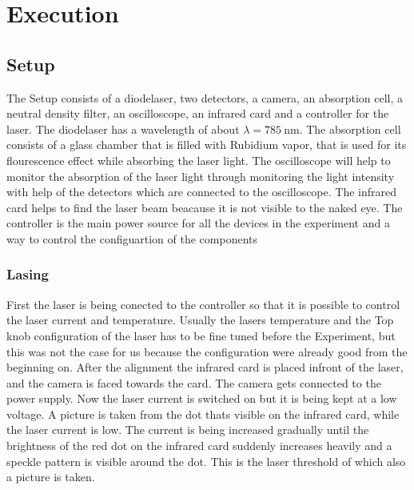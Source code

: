 \section{Execution}
\label{sec:Durchführung}

\subsection{Setup}
The Setup consists of a diodelaser, two detectors, a camera, an absorption cell, a neutral density filter, an oscilloscope, an infrared card and a controller for the laser.
The diodelaser has a wavelength of about $\lambda = \SI{785}{\nano\meter}$.
The absorption cell consists of a glass chamber that is filled with Rubidium vapor, that is used for its flourescence effect while absorbing the laser light.
The oscilloscope will help to monitor the absorption of the laser light through monitoring the light intensity with help of the detectors which are connected to the oscilloscope.
The infrared card helps to find the laser beam beacause it is not visible to the naked eye.
The controller is the main power source for all the devices in the experiment and a way to control the configuartion of the components

\subsubsection{Lasing}
First the laser is being conected to the controller so that it is possible to control the laser current and temperature.
Usually the lasers temperature and the Top knob configuration of the laser has to be fine tuned before the Experiment, but this was not the case for us because the configuration were already good from the beginning on.
After the alignment the infrared card is placed infront of the laser, and the camera is faced towards the card.
The camera gets connected to the power supply.
Now the laser current is switched on but it is being kept at a low voltage.
A picture is taken from the dot thats visible on the infrared card, while the laser current is low.
The current is being increased gradually until the brightness of the red dot on the infrared card suddenly increases heavily and a speckle pattern is visible around the dot.
This is the laser threshold of which also a picture is taken.

